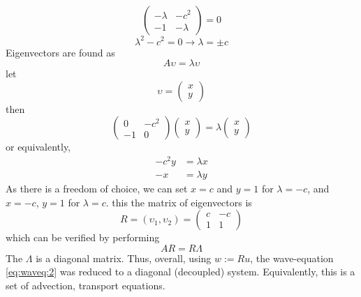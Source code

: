 \documentclass{article}
\begin{document}
\begin{equation}
	\begin{pmatrix}
	-\lambda & -c^2 \\
	-1 & -\lambda
	\end{pmatrix}
	= 0
\end{equation}
\begin{equation}
	\lambda^2 - c^2 = 0 \rightarrow \lambda = \pm c
\end{equation}
Eigenvectors are found as 
\begin{equation}
	A\upsilon = \lambda\upsilon
\end{equation}
let 
\begin{equation}
	\upsilon = 
	\begin{pmatrix}
	x \\
	y
	\end{pmatrix}
\end{equation}
then
\begin{equation}
	\begin{pmatrix}
	0 & -c^2 \\
	-1 & 0
	\end{pmatrix}
	\begin{pmatrix}
	x \\ 
	y
	\end{pmatrix}
	= \lambda
	\begin{pmatrix}
	x \\
	y
	\end{pmatrix}
\end{equation}
or equivalently,
\begin{equation}
	\begin{aligned}
	-c^2y &= \lambda x \\
	-x &= \lambda y
	\end{aligned}
\end{equation}
As there is a freedom of choice, we can set $x=c$ and $y=1$ for $\lambda=-c$, and $x=-c$, $y=1$ for $\lambda=c$.
this the matrix of eigenvectors is 
\begin{equation}
	R = (\upsilon_1, \upsilon_2) = 
	\begin{pmatrix}
	c & -c \\
	1 & 1
	\end{pmatrix}
\end{equation}
which can be verified by performing 
\begin{equation}
	AR = R\Lambda
\end{equation}
The $\Lambda$ is a diagonal matrix. Thus, overall, using $w := Ru$, the wave-equation \ref{eq:waveq:2} was reduced to a diagonal (decoupled) system. Equivalently, this is a set of advection, transport equations. 
\end{document}

